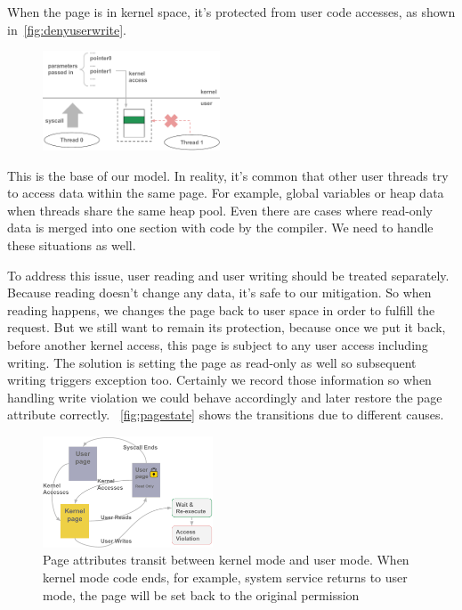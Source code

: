 When the page is in kernel space, it's protected from user code accesses, as shown in~\autoref{fig:denyuserwrite}.

\begin{figure}[th]
  \includegraphics[width=0.47\textwidth]{figures/denyuserwrite}
  \centering
  \caption{}
  \label{fig:denyuserwrite}
\end{figure}


This is the base of our model. In reality, it's common that other user threads try to access data within the same page. For example, global variables or heap data when threads share the same heap pool. Even there are cases where read-only data is merged into one section with code by the compiler. We need to handle these situations as well.

To address this issue, user reading and user writing should be treated separately. Because reading doesn't change any data, it's safe to our mitigation. So when reading happens, we changes the page back to user space in order to fulfill the request. But we still want to remain its protection, because once we put it back, before another kernel access, this page is subject to any user access including writing. The solution is setting the page as read-only as well so subsequent writing triggers exception too. Certainly we record those information so when handling write violation we could behave accordingly and later restore the page attribute correctly. ~\autoref{fig:pagestate} shows the transitions due to different causes. 


\begin{figure}[th]
  \includegraphics[width=0.45\textwidth]{figures/pagestate}
  \centering
  \caption{Page attributes transit between kernel mode and user mode. When kernel mode code ends, for example, system service returns to user mode, the page will be set back to the original permission}
  \label{fig:pagestate}
\end{figure}


